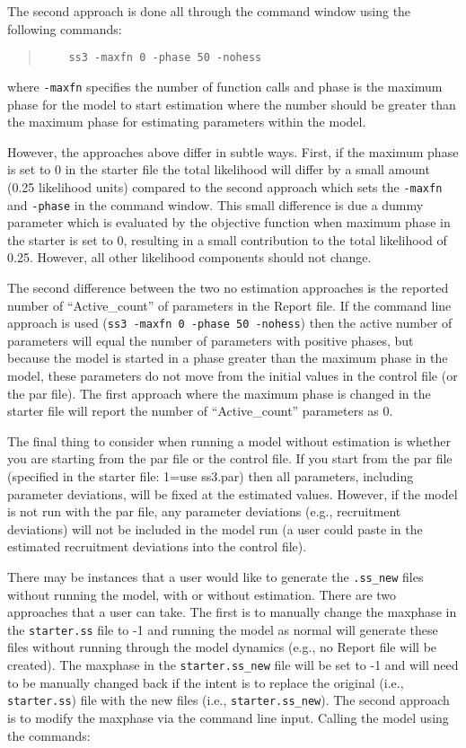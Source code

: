 The second approach is done all through the command window using the following commands:

\begin{quote}
	\begin{verbatim}
	ss3 -maxfn 0 -phase 50 -nohess
	\end{verbatim}
\end{quote}

where \texttt{-maxfn} specifies the number of function calls and phase is the maximum phase for the model to start estimation where the number should be greater than the maximum phase for estimating parameters within the model. 

However, the approaches above differ in subtle ways. First, if the maximum phase is set to 0 in the starter file the total likelihood will differ by a small amount (0.25 likelihood units) compared to the second approach which sets the \texttt{-maxfn} and \texttt{-phase} in the command window. This small difference is due a dummy parameter which is evaluated by the objective function when maximum phase in the starter is set to 0, resulting in a small contribution to the total likelihood of 0.25. However, all other likelihood components should not change.  

The second difference between the two no estimation approaches is the reported number of ``Active\_count'' of parameters in the Report file. If the command line approach is used (\texttt{ss3 -maxfn 0 -phase 50 -nohess}) then the active number of parameters will equal the number of parameters with positive phases, but because the model is started in a phase greater than the maximum phase in the model, these parameters do not move from the initial values in the control file (or the par file). The first approach where the maximum phase is changed in the starter file will report the number of ``Active\_count'' parameters as 0.  

The final thing to consider when running a model without estimation is whether you are starting from the par file or the control file. If you start from the par file (specified in the starter file: 1=use ss3.par) then all parameters, including parameter deviations, will be fixed at the estimated values. However, if the model is not run with the par file, any parameter deviations (e.g., recruitment deviations) will not be included in the model run (a user could paste in the estimated recruitment deviations into the control file). 

There may be instances that a user would like to generate the \texttt{.ss\_new} files without running the model, with or without estimation. There are two approaches that a user can take. The first is to manually change the maxphase in the \texttt{starter.ss} file to -1 and running the model as normal will generate these files without running through the model dynamics (e.g., no Report file will be created). The maxphase in the \texttt{starter.ss\_new} file will be set to -1 and will need to be manually changed back if the intent is to replace the original (i.e., \texttt{starter.ss}) file with the new files (i.e., \texttt{starter.ss\_new}). The second approach is to modify the maxphase via the command line input. Calling the model using the commands:

